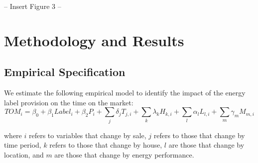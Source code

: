 \documentclass[12pt]{article}
\begin{document}
\begin{center}
-- Insert Figure 3 --
\end{center}

\section{Methodology and Results}

\subsection{Empirical Specification}

We estimate the following empirical model to identify the impact of the energy label provision on the time on the market:  
\begin{equation}
TOM_{i} = \beta_0 + \beta_1 Label_i + \beta_2 P_i + \sum_j \delta_j T_{j,i} + \sum_k \lambda_k H_{k,i} + \sum_l \alpha_l L_{l,i} + \sum_m \gamma_m M_{m,i} 
\end{equation}

\noindent where $i$ refers to variables that change by sale, $j$ refers to those that change by time period, $k$ refers to those that change by house, $l$ are those that change by location, and $m$ are those that change by energy performance.
 
\end{document}

